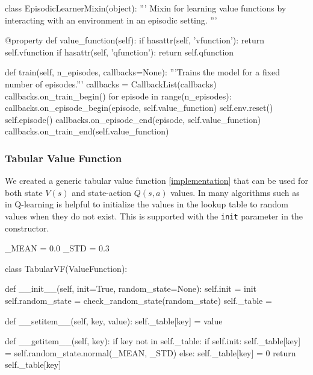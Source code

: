 \documentclass{article}
\newcommand{\GithubURL}[1]{[\href{https://github.com/davidrobles/mlnd-capstone-code/blob/master/#1}{implementation}]}
\begin{document}
\begin{python}
class EpisodicLearnerMixin(object):
    '''
    Mixin for learning value functions by interacting with an
    environment in an episodic setting.
    '''

    @property
    def value_function(self):
        if hasattr(self, 'vfunction'):
            return self.vfunction
        if hasattr(self, 'qfunction'):
            return self.qfunction

    def train(self, n_episodes, callbacks=None):
        '''Trains the model for a fixed number of episodes.'''
        callbacks = CallbackList(callbacks)
        callbacks.on_train_begin()
        for episode in range(n_episodes):
            callbacks.on_episode_begin(episode, self.value_function)
            self.env.reset()
            self.episode()
            callbacks.on_episode_end(episode, self.value_function)
        callbacks.on_train_end(self.value_function)
\end{python}

\subsubsection{Tabular Value Function}

We created a generic tabular value function \GithubURL{capstone/rl/value_functions/tabular.py} that
can be used for both state $V(s)$ and state-action $Q(s, a)$ values. In many algorithms such as in
Q-learning is helpful to initialize the values in the lookup table to random values when they do not
exist. This is supported with the \texttt{init} parameter in the constructor.

\begin{python}
_MEAN = 0.0
_STD = 0.3

class TabularVF(ValueFunction):

    def __init__(self, init=True, random_state=None):
        self.init = init
        self.random_state = check_random_state(random_state)
        self._table = {}

    def __setitem__(self, key, value):
        self._table[key] = value

    def __getitem__(self, key):
        if key not in self._table:
            if self.init:
                self._table[key] = self.random_state.normal(_MEAN, _STD)
            else:
                self._table[key] = 0
        return self._table[key]
\end{python}
\end{document}
